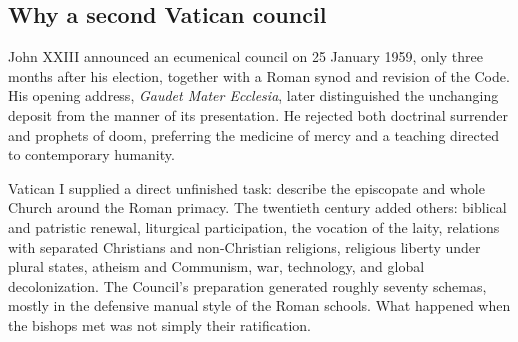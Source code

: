 \subsection{Why a second Vatican council}

John XXIII announced an ecumenical council on 25 January 1959, only three months after his election, together with a Roman synod and revision of the Code. His opening address, \emph{Gaudet Mater Ecclesia}, later distinguished the unchanging deposit from the manner of its presentation. He rejected both doctrinal surrender and prophets of doom, preferring the medicine of mercy and a teaching directed to contemporary humanity.

Vatican I supplied a direct unfinished task: describe the episcopate and whole Church around the Roman primacy. The twentieth century added others: biblical and patristic renewal, liturgical participation, the vocation of the laity, relations with separated Christians and non-Christian religions, religious liberty under plural states, atheism and Communism, war, technology, and global decolonization. The Council's preparation generated roughly seventy schemas, mostly in the defensive manual style of the Roman schools. What happened when the bishops met was not simply their ratification.

